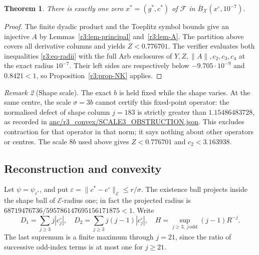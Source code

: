 \documentclass[11pt]{amsart}
\newtheorem{theorem}{Theorem}[section]
\theoremstyle{definition}
\theoremstyle{remark}
\newtheorem{remark}[theorem]{Remark}
\numberwithin{equation}{section}
\newcommand{\Fc}{\mathcal{F}}
\newcommand{\nrm}[1]{\lVert #1\rVert}
\begin{document}
\begin{theorem}\label{r3:thm-zero}
There is exactly one zero $x^*=(g^*,c^*)$ of $\Fc$ in $\overline B_{\mathcal X}(x^\circ,10^{-7})$.
\end{theorem}
\begin{proof}
The finite dyadic product and the Toeplitz symbol bounds give an injective $A$ by Lemmas~\ref{r3:lem-principal} and~\ref{r3:lem-A}. The partition above covers all derivative columns and yields $Z<0.776701$. The verifier evaluates both inequalities \eqref{r3:eq-radii} with the full Arb enclosures of $Y,Z,\nrm A,c_2,c_3,c_4$ at the exact radius $10^{-7}$. Their left sides are respectively below $-9.705\cdot10^{-9}$ and $0.8421<1$, so Proposition~\ref{r3:prop-NK} applies.
\end{proof}

\begin{remark}[Shape scale]\label{r3:rem-centre}
The exact $b$ is held fixed while the shape varies. At the same centre, the scale $\sigma=3b$ cannot certify this fixed-point operator: the normalised defect of shape column $j=183$ is strictly greater than $1.15486483728$, as recorded in \url{anc/r3_convex/SCALE3_OBSTRUCTION.json}. This excludes contraction for that operator in that norm; it says nothing about other operators or centres. The scale $8b$ used above gives $Z<0.776701$ and $c_2<3.163938$.
\end{remark}

\subsection{Reconstruction and convexity}\label{r3:sec-recon}
Let $\psi=\psi_{c^*}$, and put $\varepsilon=\nrm{c^*-c^\circ}_{\mathcal E}\leq r/\sigma$. The existence ball projects inside the shape ball of $\mathcal E$-radius one; in fact the projected radius is $68719476736/595786147695156171875<1$. Write
\[
D_1=\sum_{j\geq3}j|c_j^\circ|,\quad D_2=\sum_{j\geq3}j(j-1)|c_j^\circ|,\quad H=\sup_{j\geq3,\ j\,\mathrm{odd}}(j-1)R^{-j}.
\]
The last supremum is a finite maximum through $j=21$, since the ratio of successive odd-index terms is at most one for $j\geq21$.
\end{document}
